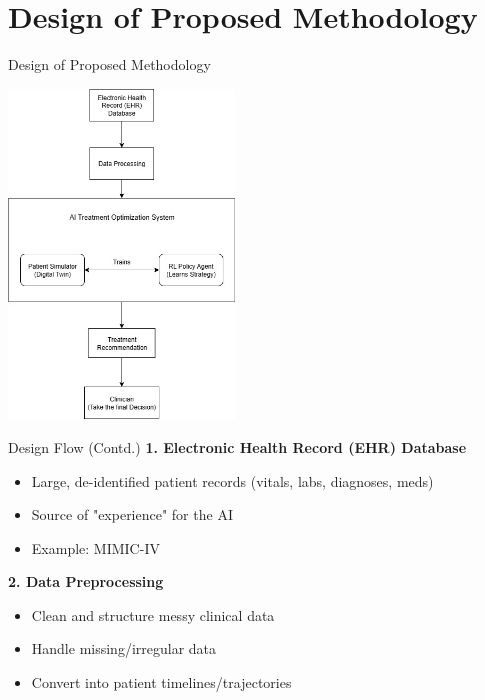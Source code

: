 \documentclass[11pt]{beamer}
\begin{document}
\section{Design of Proposed Methodology}
\begin{frame}{Design of Proposed Methodology}
    \begin{center}
        \includegraphics[width=0.45\textwidth]{design_flow.jpg} %
    \end{center}
\end{frame}

\begin{frame}{Design Flow (Contd.)}
    \textbf{1. Electronic Health Record (EHR) Database}
    \begin{itemize}
        \item Large, de-identified patient records (vitals, labs, diagnoses, meds)
        \item Source of "experience" for the AI
        \item Example: MIMIC-IV
    \end{itemize}

    \vspace{0.3cm}
    \textbf{2. Data Preprocessing}
    \begin{itemize}
        \item Clean and structure messy clinical data
        \item Handle missing/irregular data
        \item Convert into patient timelines/trajectories
    \end{itemize}
\end{frame}
\end{document}
